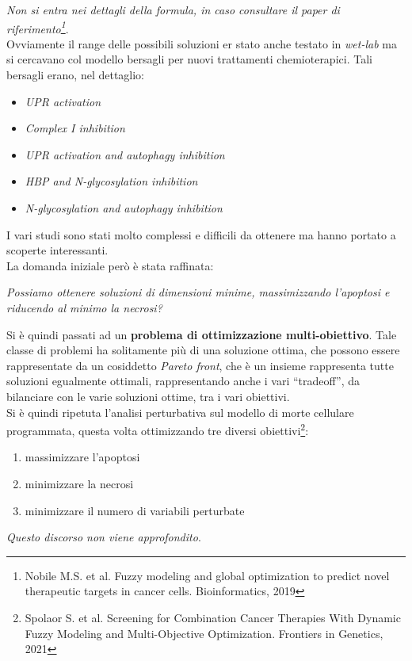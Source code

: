 \documentclass[a4paper,12pt, oneside]{book}
\begin{document}
\textit{Non si entra nei dettagli della formula, in caso consultare il paper di
  riferimento\footnote{Nobile M.S. et al. Fuzzy modeling and global optimization
    to predict novel therapeutic 
    targets in cancer cells. Bioinformatics, 2019}}.\\
Ovviamente il range delle possibili soluzioni er stato anche testato in
\textit{wet-lab} ma si cercavano col modello bersagli per nuovi trattamenti
chemioterapici. Tali bersagli erano, nel dettaglio:
\begin{itemize}
  \item \textit{UPR activation}
  \item \textit{Complex I inhibition}
  \item \textit{UPR activation and autophagy inhibition}
  \item \textit{HBP and N-glycosylation inhibition}
  \item \textit{N-glycosylation and autophagy inhibition}
\end{itemize}
I vari studi sono stati molto complessi e difficili da ottenere ma hanno portato
a scoperte interessanti.\\
La domanda iniziale però è stata raffinata:
\begin{center}
  \textit{Possiamo ottenere soluzioni di dimensioni minime, massimizzando
    l'apoptosi e riducendo al minimo la necrosi?} 
\end{center}
Si è quindi passati ad un \textbf{problema di ottimizzazione
  multi-obiettivo}. Tale classe di problemi ha solitamente più di una soluzione
ottima, che possono essere rappresentate da un cosiddetto \textit{Pareto front},
che è un insieme rappresenta tutte soluzioni egualmente ottimali, rappresentando
anche i vari ``tradeoff'', da bilanciare con le varie soluzioni ottime, tra i
vari obiettivi. \\
Si è quindi ripetuta l'analisi perturbativa sul modello di morte cellulare
programmata, questa volta ottimizzando tre diversi obiettivi\footnote{Spolaor
  S. et al. Screening for Combination Cancer Therapies With Dynamic Fuzzy
  Modeling and Multi-Objective Optimization. Frontiers in Genetics, 2021}: 
\begin{enumerate}
  \item massimizzare l'apoptosi
  \item minimizzare la necrosi
  \item minimizzare il numero di variabili perturbate
\end{enumerate}
\textit{Questo discorso non viene approfondito}.\\
\end{document}
